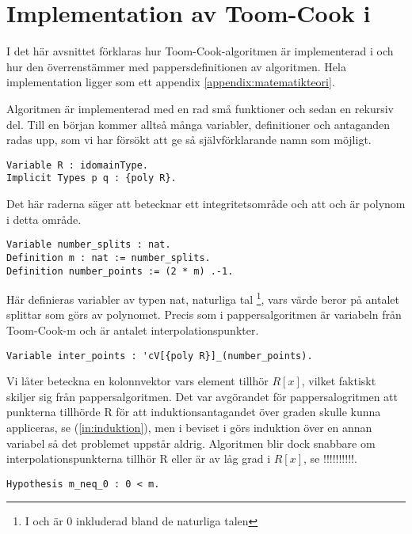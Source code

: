 \section{Implementation av Toom-Cook i \coq}
\label{sec:formellimplementation}
I det här avsnittet förklaras hur Toom-Cook-algoritmen är implementerad i
\ssr och hur den överrenstämmer med pappersdefinitionen av algoritmen.
Hela implementation ligger som ett appendix \ref{appendix:matematikteori}.

Algoritmen är implementerad med en rad små funktioner och sedan en rekursiv
del. Till en början kommer alltså många variabler, definitioner och antaganden
radas upp, som vi har försökt att ge så självförklarande namn som möjligt.

\begin{lstlisting}
Variable R : idomainType.
Implicit Types p q : {poly R}.
\end{lstlisting}

Det här raderna säger att  betecknar ett integritetsområde och att 
och  är polynom i detta område.

\begin{lstlisting}
Variable number_splits : nat.
Definition m : nat := number_splits.
Definition number_points := (2 * m) .-1.
\end{lstlisting}

Här definieras variabler av typen nat, naturliga tal \footnote{I \coq och \ssr
är 0 inkluderad bland de naturliga talen}, vars värde beror på antalet splittar
som görs av polynomet. Precis som i pappersalgoritmen är  variabeln från
Toom-Cook-m och  är antalet interpolationspunkter.

\begin{lstlisting}
Variable inter_points : 'cV[{poly R}]_(number_points).
\end{lstlisting}

Vi låter  beteckna en kolonnvektor vars element tillhör $R[x]$,
vilket faktiskt skiljer sig från pappersalgoritmen. Det var avgörandet för
pappersalogritmen att punkterna tillhörde R för att induktionsantagandet över
graden skulle kunna appliceras, se (\ref{in:induktion}), men i beviset i
\ssr görs induktion över en annan variabel så det problemet uppstår
aldrig. Algoritmen blir dock snabbare om interpolationspunkterna tillhör R
eller är av låg grad i $R[x]$, se !!!!!!!!!!.

\begin{lstlisting}
Hypothesis m_neq_0 : 0 < m.
\end{lstlisting}

